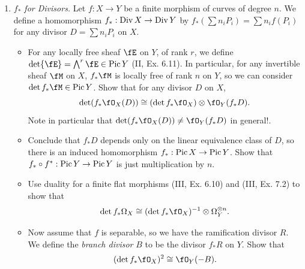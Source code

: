 \documentclass[a4paper]{article}
\begin{document}
\begin{enumerate} [label=\textbf{\arabic*.}, leftmargin=0em]
\begin{proof}
\begin{enumerate} [leftmargin=0cm]
            \item[(b)] The following gives the minimum value
                  \begin{equation*}
                    g(Y) = 0, \quad s = 3, \quad r_1 = \frac{1}{2}, \quad r_2 = \frac{1}{3}, \quad r_3 = \frac{1}{7}.
                  \end{equation*}
                  We conclude that
                  \begin{equation*}
                    n \leq 42(2g - 2) = 84(g - 1).
                  \end{equation*}
          \end{enumerate}
        \end{proof}

  \item \textit{$f_*$ for Divisors.} Let $f : X \to Y$ be a finite morphism of curves of degree $n$.
        We define a homomorphism $f_* : \operatorname{Div}{X} \to \operatorname{Div}{Y}$ by $f_*(\sum n_i P_i) = \sum n_i f(P_i)$ for any divisor $D = \sum n_i P_i$ on $X$.
        \begin{itemize}
          \item[(a)] For any locally free sheaf $\fE$ on $Y$, of rank $r$, we define $\det \fE = \bigwedge^r \fE \in \pic{Y}$ (II, Ex. 6.11).
                In particular, for any invertible sheaf $\fM$ on $X$, $f_*\fM$ is locally free of rank $n$ on $Y$, so we can consider $\det f_*\fM \in \pic{Y}$.
                Show that for any divisor $D$ on $X$,
                \begin{equation*}
                  \det(f_*\fO_X(D)) \cong (\det f_*\fO_X) \otimes \fO_Y(f_*D).
                \end{equation*}
                Note in particular that $\det(f_*\fO_X(D)) \neq \fO_Y(f_*D)$ in general!.
          \item[(b)] Conclude that $f_*D$ depends only on the linear equivalence class of $D$, so there is an induced homomorphism $f_* : \operatorname{Pic}{X} \to \operatorname{Pic}{Y}$.
                Show that $f_* \circ f^* : \operatorname{Pic}{Y} \to \operatorname{Pic}{Y}$ is just multiplication by $n$.
          \item[(c)] Use duality for a finite flat morphisms (III, Ex. 6.10) and (III, Ex. 7.2) to show that
                \begin{equation*}
                  \det f_*\Omega_X \cong (\det f_*\fO_X )^{-1} \otimes \Omega_Y^{\otimes n}.
                \end{equation*}
          \item[(d)] Now assume that $f$ is separable, so we have the ramification divisor $R$.
                We define the \textit{branch divisor} $B$ to be the divisor $f_*R$ on $Y$.
                Show that
                \begin{equation*}
                  (\det f_*\fO_X)^2 \cong \fO_Y(-B).
                \end{equation*}
        \end{itemize}


\end{enumerate}
\end{document}
